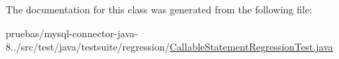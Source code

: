 The documentation for this class was generated from the following file\+:\begin{DoxyCompactItemize}
\item 
pruebas/mysql-\/connector-\/java-\/8../src/test/java/testsuite/regression/\mbox{\hyperlink{_callable_statement_regression_test_8java}{Callable\+Statement\+Regression\+Test.\+java}}\end{DoxyCompactItemize}

